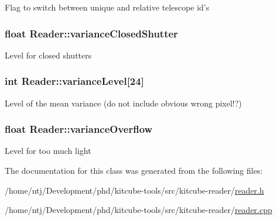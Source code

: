 Flag to switch between unique and relative telescope id's \hypertarget{classReader_a2318276c2913fe9eb87c1b49c786d9b5}{
\subsubsection[{variance\-Closed\-Shutter}]{\setlength{\rightskip}{0pt plus 5cm}float Reader\-::variance\-Closed\-Shutter\hspace{0.3cm}{\ttfamily [private]}}}\label{classReader_a2318276c2913fe9eb87c1b49c786d9b5}
Level for closed shutters \hypertarget{classReader_a57a28f21905a04e6eeb0008840ed7ab6}{
\subsubsection[{variance\-Level}]{\setlength{\rightskip}{0pt plus 5cm}int Reader\-::variance\-Level\mbox{[}24\mbox{]}\hspace{0.3cm}{\ttfamily [private]}}}\label{classReader_a57a28f21905a04e6eeb0008840ed7ab6}
Level of the mean variance (do not include obvious wrong pixel!?) \hypertarget{classReader_a55a312840dc5e05cbadcc8002838a252}{
\subsubsection[{variance\-Overflow}]{\setlength{\rightskip}{0pt plus 5cm}float Reader\-::variance\-Overflow\hspace{0.3cm}{\ttfamily [private]}}}\label{classReader_a55a312840dc5e05cbadcc8002838a252}
Level for too much light 

The documentation for this class was generated from the following files\-:\begin{DoxyCompactItemize}
\item 
/home/ntj/\-Development/phd/kitcube-\/tools/src/kitcube-\/reader/\hyperlink{reader_8h}{reader.\-h}\item 
/home/ntj/\-Development/phd/kitcube-\/tools/src/kitcube-\/reader/\hyperlink{reader_8cpp}{reader.\-cpp}\end{DoxyCompactItemize}
